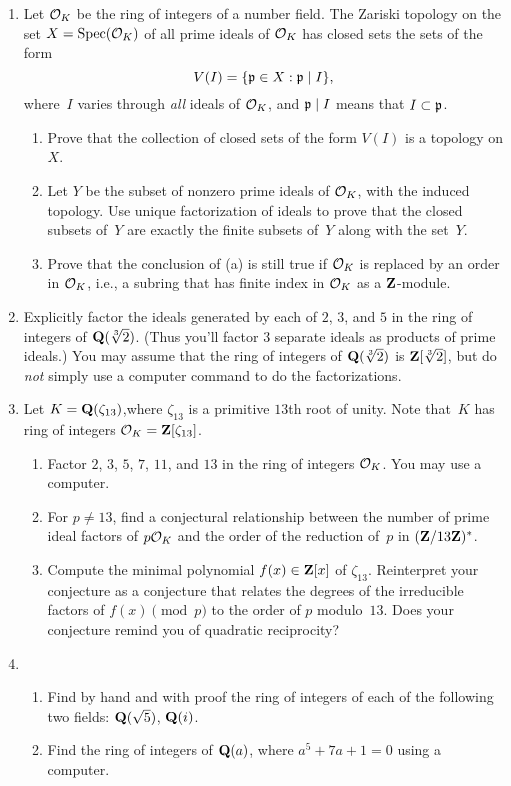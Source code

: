 \begin{enumerate}
\item Let $\mathcal{O}_K$ be the ring of integers of a number field.  
The Zariski topology on the set $X=\operatorname{Spec}(\mathcal{O}_K)$ of all prime ideals
of $\mathcal{O}_K$ has closed sets the sets of the form 
$$
  V(I) = \{ \mathfrak{p}\in X : \mathfrak{p} \mid I\},
$$
where~$I$ varies through {\em all} ideals of $\mathcal{O}_K$, and $\mathfrak{p}\mid I$
means that $I \subset \mathfrak{p}$.
\begin{enumerate}
\item Prove that the collection of closed sets of the
form $V(I)$ is a topology on $X$.  
\item Let $Y$ be the subset of nonzero prime ideals of $\mathcal{O}_K$, with
the induced topology.  Use
unique factorization of ideals to prove
that the closed subsets of~$Y$ are exactly the finite subsets
of~$Y$ along with the set~$Y$.
\item Prove that the conclusion of (a) is still true if $\mathcal{O}_K$ is replaced
by an order in $\mathcal{O}_K$, i.e., a subring that has finite
index in $\mathcal{O}_K$ as a $\mathbf{Z}$-module. 
\end{enumerate}

\item Explicitly factor the ideals generated by each of $2$, $3$, and $5$ in 
the ring of integers of $\mathbf{Q}(\sqrt[3]{2})$.  (Thus you'll factor $3$ separate
ideals as products of prime ideals.)
You may assume that the ring of integers of $\mathbf{Q}(\sqrt[3]{2})$
is $\mathbf{Z}[\sqrt[3]{2}]$, but do {\em not} simply
use a computer command to do the factorizations.

\item
Let $K=\mathbf{Q}(\zeta_{13})$,where $\zeta_{13}$ is a primitive
$13$th root of unity.  Note that~$K$ has ring of integers $\mathcal{O}_K=\mathbf{Z}[\zeta_{13}]$.
\begin{enumerate}
\item Factor $2$, $3$, $5$, $7$, $11$, and $13$ in the ring 
of integers $\mathcal{O}_K$.  You may use a computer.  
\item For $p\neq 13$, find a conjectural 
relationship between the number of prime ideal factors of $p\mathcal{O}_K$
and the order of the reduction of~$p$  in $(\mathbf{Z}/13\mathbf{Z})^*$.
\item Compute the minimal polynomial $f(x)\in\mathbf{Z}[x]$ of $\zeta_{13}$.
Reinterpret your conjecture as a conjecture that
relates the degrees of the irreducible factors of $f(x)\pmod{p}$ to 
the order of $p$ modulo~$13$.  Does your conjecture 
remind you of quadratic reciprocity?
\end{enumerate}

\item
\begin{enumerate}
\item Find by hand  and with proof 
the ring of integers of each of the following two fields: 
$\mathbf{Q}(\sqrt{5})$, $\mathbf{Q}(i)$.  
\item Find the ring of integers of $\mathbf{Q}(a)$, where $a^5+7a+1=0$ 
using a computer. 
\end{enumerate}


\end{enumerate}
